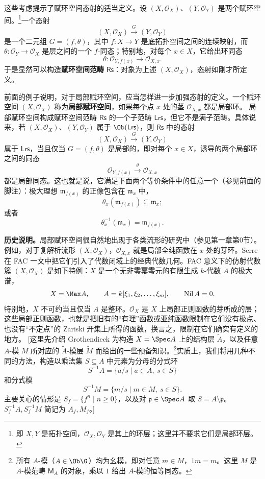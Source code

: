 这些考虑提示了赋环空间态射的适当定义。设 $(X,\mathcal O_X)$、$(Y,\mathcal O_Y)$ 是两个赋环空间。\footnote{即 $X,Y$ 是拓扑空间，$\mathcal O_X,\mathcal O_Y$ 是其上的环层；这里并不要求它们是局部环层。}一个态射
\[
(X,\mathcal O_X)\xrightarrow{G}(Y,\mathcal O_Y)
\]
是一个二元组 $G=(f,\theta)$，其中 $f:X\to Y$ 是底拓扑空间之间的连续映射，而 $\theta:\mathcal O_Y\to\mathcal O_X$ 是层之间的一个 $f$-同态；特别地，对每个 $x\in X$，它给出环同态
\[
\theta:\mathcal O_{Y,f(x)}\longrightarrow\mathcal O_{X,x}.
\]
于是显然可以构造\textbf{赋环空间范畴} $\mathsf{Rs}$：对象为上述 $(X,\mathcal O_X)$，态射如刚才所定义。

前面的例子说明，对于局部赋环空间，应当怎样进一步加强态射的定义。一个赋环空间 $(X,\mathcal O_X)$ 称为\textbf{局部赋环空间}，如果每个点 $x$ 处的茎 $\mathcal O_{X,x}$ 都是局部环。
局部赋环空间构成赋环空间范畴 $\mathsf{Rs}$ 的一个子范畴 $\mathsf{Lrs}$，但它不是满子范畴。具体说来，若 $(X,\mathcal O_X)$、$(Y,\mathcal O_Y)$ 属于 $\Ob(\mathsf{Lrs})$，则 $\mathsf{Rs}$ 中的态射
\[
(X,\mathcal O_X)\xrightarrow{G}(Y,\mathcal O_Y)
\]
属于 $\mathsf{Lrs}$，当且仅当 $G=(f,\theta)$ 是局部的，即对每个 $x\in X$，诱导的两个局部环之间的同态
\[
\mathcal O_{Y,f(x)}\xrightarrow{\theta}\mathcal O_{X,x}
\]
都是局部同态。这也就是说，它满足下面两个等价条件中的任意一个（参见前面的脚注）：极大理想 $\mathfrak m_{f(x)}$ 的正像包含在 $\mathfrak m_x$ 中，
\begin{equation}\tag{7.4}
\theta_x(\mathfrak m_{f(x)})\subseteq\mathfrak m_x;
\end{equation}
或者
\begin{equation}\tag{7.5}
\theta_x^{-1}(\mathfrak m_x)=\mathfrak m_{f(x)}.
\end{equation}

\textbf{历史说明。}局部赋环空间很自然地出现于各类流形的研究中（参见第一章第0节）。例如，对于复解析流形 $(X,\mathcal O_X)$，$\mathcal O_{X,x}$ 就是局部全纯函数在 $x$ 处的芽环。Serre 在 FAC 一文中把它们引入了代数闭域上的经典代数几何。FAC 意义下的仿射代数簇 $(X,\mathcal O_X)$ 是如下特例：$X$ 是一个无非零幂零元的有限生成 $k$-代数 $A$ 的极大谱，
\[
X=\Max A,\qquad A=k[\xi_1,\xi_2,\ldots,\xi_m],\qquad\operatorname{Nil}A=0.
\]
特别地，$X$ 不可约当且仅当 $A$ 是整环。$\mathcal O_X$ 是 $X$ 上局部正则函数的芽所成的层；这些局部正则函数，也就是把旧有的“有理”函数或亚纯函数限制在它们没有极点、也没有“不定点”的 Zariski 开集上所得的函数，换言之，限制在它们确实有定义的地方。
[这里先介绍 Grothendieck 为构造 $X=\Spec A$ 上的结构层 $\widetilde A$，以及任意 $A$-模 $M$ 所对应的 $\widetilde A$-模层 $\widetilde M$ 而给出的一些预备知识。\footnote{所有 $A$-模（$A\in\Ob\G$）均为幺模，即对任意 $m\in M$，$1m=m$。这里 $M$ 是 $A$-模范畴 $\mathsf M_A$ 的对象，乘以 $1$ 给出 $A$-模的恒等同态。}实质上，我们将用几种不同的方法，构造以乘法集 $S\subseteq A$ 中元素为分母的分式环
\[
S^{-1}A=\{a/s\mid a\in A,\ s\in S\}
\]
和分式模
\[
S^{-1}M=\{m/s\mid m\in M,\ s\in S\}.
\]
主要关心的情形是 $S_f=\{f^n\mid n\ge0\}$，以及对 $\mathfrak p\in\Spec A$ 取 $S=A\setminus\mathfrak p$。$S_f^{-1}A,S_f^{-1}M$ 简记为 $A_f,M_f$。]

